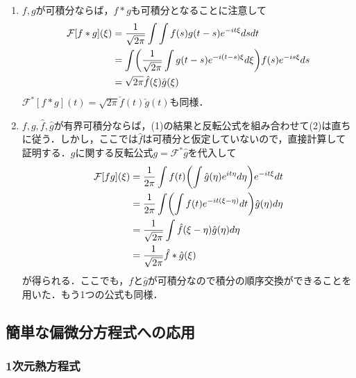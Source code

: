 \documentclass[dvipdfmx,a4j,10pt]{jsarticle}
\makeatletter
\theoremstyle{mystyle1}
\theoremstyle{mystyle3}
\theoremstyle{mystyle4}
\theoremstyle{mystyle6}
\theoremstyle{mystyle2}
\theoremstyle{mystyle5}
\renewenvironment{proof}[1][\proofname]{\par
  \pushQED{\qed}%
  \normalfont
  \topsep6\p@\@plus6\p@ \trivlist
  \item[\hskip\labelsep{\bfseries\sffamily #1}]\ignorespaces
}{%
  \popQED\endtrivlist\@endpefalse
}
\renewcommand\proofname{証明}
\renewcommand{\labelenumi}{(\roman{enumi})}
\makeatother
\begin{document}
\begin{proof}
	\renewcommand{\labelenumi}{(\arabic{enumi})}
	\begin{enumerate}
		\item $f, g$が可積分ならば，$f*g$も可積分となることに注意して
		      \[
			      \begin{split}
				      \mathcal{F}[f*g](\xi)&=\frac{1}{\sqrt{2\pi}}\int\int f(s)g(t-s)e^{-it\xi}dsdt \\
				      &=\int\mleft(\frac{1}{\sqrt{2\pi}}\int g(t-s)e^{-i(t-s)\xi}d\xi\mright)f(s)e^{-is\xi}ds \\
				      &=\sqrt{2\pi}\hat{f}(\xi)\hat{g}(\xi)
			      \end{split}
		      \]
		      $\mathcal{F}^*[f*g](t)=\sqrt{2\pi}\check{f}(t)\check{g}(t)$も同様．
		\item $f, g, \hat{f}, \hat{g}$が有界可積分ならば，(1)の結果と反転公式を組み合わせて(2)は直ちに従う．しかし，ここでは$\hat{f}$は可積分と仮定していないので，直接計算して証明する．$g$に関する反転公式$g=\mathcal{F}^*\hat{g}$を代入して
		      \[
			      \begin{split}
				      \mathcal{F}[fg](\xi)&=\frac{1}{2\pi}\int f(t)\mleft(\int\hat{g}(\eta)e^{it\eta}d\eta\mright)e^{-it\xi}dt \\
				      &=\frac{1}{2\pi}\int\mleft(\int f(t)e^{-it(\xi-\eta)}dt\mright)\hat{g}(\eta)d\eta \\
				      &=\frac{1}{\sqrt{2\pi}}\int\hat{f}(\xi-\eta)\hat{g}(\eta)d\eta \\
				      &=\frac{1}{\sqrt{2\pi}}\hat{f}*\hat{g}(\xi)
			      \end{split}
		      \]
		      が得られる．ここでも，$f$と$\hat{g}$が可積分なので積分の順序交換ができることを用いた．もう1つの公式も同様．
	\end{enumerate}
\end{proof}

\subsection{簡単な偏微分方程式への応用}

\subsubsection{1次元熱方程式}
\end{document}
